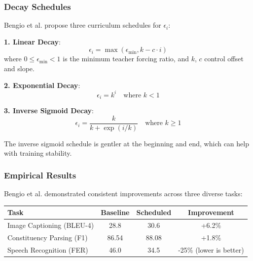 \documentclass{article}
\begin{document}
\subsubsection{Decay Schedules}

Bengio et al. propose three curriculum schedules for $\epsilon_i$:

\textbf{1. Linear Decay}:
\[
\epsilon_i = \max(\epsilon_{\min}, k - c \cdot i)
\]
where $0 \leq \epsilon_{\min} < 1$ is the minimum teacher forcing ratio, and $k$, $c$ control offset and slope.

\textbf{2. Exponential Decay}:
\[
\epsilon_i = k^i \quad \text{where } k < 1
\]

\textbf{3. Inverse Sigmoid Decay}:
\[
\epsilon_i = \frac{k}{k + \exp(i/k)} \quad \text{where } k \geq 1
\]

\begin{center}
\end{center}

The inverse sigmoid schedule is gentler at the beginning and end, which can help with training stability.

\subsubsection{Empirical Results}

Bengio et al. demonstrated consistent improvements across three diverse tasks:

\begin{center}
\begin{tabular}{|l|c|c|c|}
\hline
\textbf{Task} & \textbf{Baseline} & \textbf{Scheduled} & \textbf{Improvement} \\
\hline
Image Captioning (BLEU-4) & 28.8 & 30.6 & +6.2\% \\
Constituency Parsing (F1) & 86.54 & 88.08 & +1.8\% \\
Speech Recognition (FER) & 46.0 & 34.5 & -25\% (lower is better) \\
\hline
\end{tabular}
\end{center}
\end{document}
